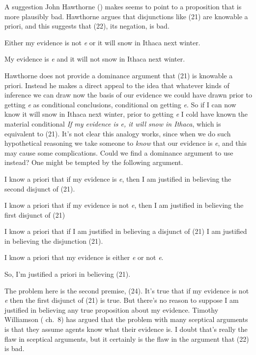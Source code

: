 \documentclass[
  11pt,
  letterpaper,
  DIV=11,
  numbers=noendperiod,
  twoside]{scrartcl}
\providecommand{\tightlist}{%
  \setlength{\itemsep}{0pt}\setlength{\parskip}{0pt}}
\begin{document}
A suggestion John Hawthorne () makes
seems to point to a proposition that is more plausibly bad. Hawthorne
argues that disjunctions like (21) are knowable a priori, and this
suggests that (22), its negation, is bad.

\begin{description}
\tightlist
\item[(21)]
Either my evidence is not \emph{e} or it will snow in Ithaca next
winter.
\item[(22)]
My evidence is \emph{e} and it will not snow in Ithaca next winter.
\end{description}

Hawthorne does not provide a dominance argument that (21) is knowable a
priori. Instead he makes a direct appeal to the idea that whatever kinds
of inference we can draw now the basis of our evidence we could have
drawn prior to getting \emph{e} as conditional conclusions, conditional
on getting \emph{e}. So if I can now know it will snow in Ithaca next
winter, prior to getting \emph{e} I cold have known the material
conditional \emph{If my evidence is e, it will snow in Ithaca}, which is
equivalent to (21). It's not clear this analogy works, since when we do
such hypothetical reasoning we take someone to \emph{know} that our
evidence is \emph{e}, and this may cause some complications. Could we
find a dominance argument to use instead? One might be tempted by the
following argument.

\begin{description}
\tightlist
\item[(23)]
I know a priori that if my evidence is \emph{e}, then I am justified in
believing the second disjunct of (21).
\item[(24)]
I know a priori that if my evidence is not \emph{e}, then I am justified
in believing the first disjunct of (21)
\item[(25)]
I know a priori that if I am justified in believing a disjunct of (21) I
am justified in believing the disjunction (21).
\item[(26)]
I know a priori that my evidence is either \emph{e} or not \emph{e}.
\item[(27)]
So, I'm justified a priori in believing (21).
\end{description}

The problem here is the second premise, (24). It's true that if my
evidence is not \emph{e} then the first disjunct of (21) is true. But
there's no reason to suppose I am justified in believing any true
proposition about my evidence. Timothy Williamson
( ch.~8) has argued that the
problem with many sceptical arguments is that they assume agents know
what their evidence is. I doubt that's really the flaw in sceptical
arguments, but it certainly is the flaw in the argument that (22) is
bad.
\end{document}
